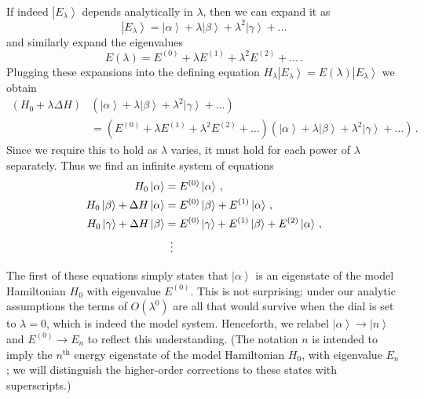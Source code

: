 \documentclass{article}
\theoremstyle{plain}\theoremheaderfont{\normalfont\itshape}\theorembodyfont{\rmfamily}\theoremseparator{.}\newtheorem*{rem}{Remark}\newtheorem*{ex}{Example}\newtheorem*{proof}{Proof}\newtheorem*{altp}{Alternative proof}
\theoremstyle{plain}\theoremheaderfont{\normalfont\bfseries}\theorembodyfont{\rmfamily}\theoremseparator{.}\newtheorem{thm}{Theorem}[section]\newtheorem{lem}[thm]{Lemma}\newtheorem{prop}[thm]{Proposition}\newtheorem*{cor}{Corollary}\newtheorem{defn}[thm]{Definition}\newtheorem{clm}[thm]{Claim}\newtheorem{clminproof}{Claim}
\theoremstyle{break}\theoremheaderfont{\normalfont\itshape}\theorembodyfont{\rmfamily}\theoremseparator{.\medskip}\newtheorem*{proofskip}{Proof}\newtheorem*{exs}{Examples}\newtheorem*{rems}{Remarks}
\theoremstyle{break}\theoremheaderfont{\normalfont\bfseries}\theorembodyfont{\rmfamily}\theoremseparator{.\medskip}\newtheorem{lemskip}[thm]{Lemma}\newtheorem{defnskip}[thm]{Definition}\newtheorem{propskip}[thm]{Proposition}\newtheorem{thmskip}[thm]{Theorem}
\numberwithin{equation}{section}
\newcommand{\ket}[1]{\left| #1 \right\rangle}
\begin{document}
    If indeed \(\ket{E_\lambda}\) depends analytically in \(\lambda\), then we can expand it as
    \begin{equation}
        \ket{E_\lambda}=\ket{\alpha}+\lambda\ket{\beta}+\lambda^2\ket{\gamma}+\dots
    \end{equation}
    and similarly expand the eigenvalues
    \begin{equation}
        E(\lambda)=E^{(0)}+\lambda E^{(1)}+\lambda^2 E^{(2)}+\dots\,.
    \end{equation}
    Plugging these expansions into the defining equation \(H_\lambda\ket{E_\lambda}=E(\lambda)\ket{E_\lambda}\) we obtain
    \begin{equation}
        \begin{aligned}
            (H_0+\lambda\Delta H)&(\ket{\alpha}+\lambda\ket{\beta}+\lambda^2\ket{\gamma}+\dots)\\
            &=\left(E^{(0)}+\lambda E^{(1)}+\lambda^2 E^{(2)}+\dots\right)(\ket{\alpha}+\lambda\ket{\beta}+\lambda^2\ket{\gamma}+\dots)\,.
        \end{aligned}
    \end{equation}
    Since we require this to hold as \(\lambda\) varies, it must hold for each power of \(\lambda\) separately. Thus we find an infinite system of equations
    \begin{align}
        H_0\ket{\alpha}&=E^{(0)}\ket{\alpha}\,,\\
        H_0\ket{\beta}+\Delta H\ket{\alpha}&=E^{(0)}\ket{\beta}+E^{(1)}\ket{\alpha}\,,\label{first_order_perturbation}\\
        H_0\ket{\gamma}+\Delta H\ket{\beta}&=E^{(0)}\ket{\gamma}+E^{(1)}\ket{\beta}+E^{(2)}\ket{\alpha}\,,\label{second_order_perturbation}\\
        &\ \, \vdots\notag
    \end{align}

    The first of these equations simply states that \(\ket{\alpha}\) is an eigenstate of the model Hamiltonian \(H_0\) with eigenvalue \(E^{(0)}\). This is not surprising; under our analytic assumptions the terms of \(O(\lambda^0)\) are all that would survive when the dial is set to \(\lambda=0\), which is indeed the model system. Henceforth, we relabel \(\ket{\alpha}\to\ket{n}\) and \(E^{(0)}\to E_n\) to reflect this understanding. (The notation \(n\) is intended to imply the \(n^{\text{th}}\) energy eigenstate of the model Hamiltonian \(H_0\), with eigenvalue \(E_n\); we will distinguish the higher-order corrections to these states with superscripts.)
\end{document}

